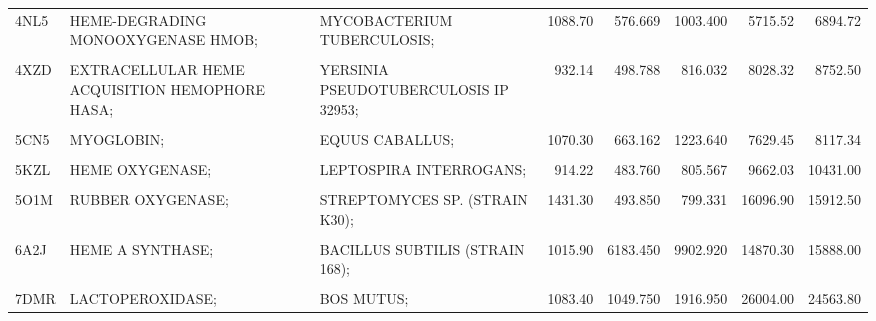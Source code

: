 \begin{table}
{\begin{tabular}{lllrrrrr}
				\addlinespace
				4NL5 & HEME-DEGRADING MONOOXYGENASE HMOB; & MYCOBACTERIUM TUBERCULOSIS; & 1088.70 & 576.669 & 1003.400 & 5715.52 & 6894.72\\
				\cellcolor{gray!6}{4UZV} & \cellcolor{gray!6}{HEMOGLOBIN;} & \cellcolor{gray!6}{THERMOBIFIDA FUSCA TM51;} & \cellcolor{gray!6}{1184.10} & \cellcolor{gray!6}{526.584} & \cellcolor{gray!6}{844.058} & \cellcolor{gray!6}{7378.28} & \cellcolor{gray!6}{8322.74}\\
				4XZD & EXTRACELLULAR HEME ACQUISITION HEMOPHORE HASA; & YERSINIA PSEUDOTUBERCULOSIS IP 32953; & 932.14 & 498.788 & 816.032 & 8028.32 & 8752.50\\
				\cellcolor{gray!6}{4Y1Q} & \cellcolor{gray!6}{EXTRACELLULAR HEME ACQUISITION HEMOPHORE HASA;} & \cellcolor{gray!6}{YERSINIA PSEUDOTUBERCULOSIS IP 32953;} & \cellcolor{gray!6}{952.23} & \cellcolor{gray!6}{494.939} & \cellcolor{gray!6}{806.960} & \cellcolor{gray!6}{7905.84} & \cellcolor{gray!6}{8785.04}\\
				5CN5 & MYOGLOBIN; & EQUUS CABALLUS; & 1070.30 & 663.162 & 1223.640 & 7629.45 & 8117.34\\
				\addlinespace
				\cellcolor{gray!6}{5GJ3} & \cellcolor{gray!6}{PERIPLASMIC BINDING PROTEIN;} & \cellcolor{gray!6}{ROSEIFLEXUS SP. RS-1;} & \cellcolor{gray!6}{1108.20} & \cellcolor{gray!6}{756.603} & \cellcolor{gray!6}{1131.670} & \cellcolor{gray!6}{11394.00} & \cellcolor{gray!6}{12591.80}\\
				5KZL & HEME OXYGENASE; & LEPTOSPIRA INTERROGANS; & 914.22 & 483.760 & 805.567 & 9662.03 & 10431.00\\
				\cellcolor{gray!6}{5O1L} & \cellcolor{gray!6}{RUBBER OXYGENASE;} & \cellcolor{gray!6}{STREPTOMYCES SP. (STRAIN K30);} & \cellcolor{gray!6}{1438.70} & \cellcolor{gray!6}{801.519} & \cellcolor{gray!6}{1447.270} & \cellcolor{gray!6}{15538.20} & \cellcolor{gray!6}{16876.00}\\
				5O1M & RUBBER OXYGENASE; & STREPTOMYCES SP. (STRAIN K30); & 1431.30 & 493.850 & 799.331 & 16096.90 & 15912.50\\
				\cellcolor{gray!6}{5VEU} & \cellcolor{gray!6}{CYTOCHROME P450 3A5;} & \cellcolor{gray!6}{HOMO SAPIENS;} & \cellcolor{gray!6}{964.76} & \cellcolor{gray!6}{993.578} & \cellcolor{gray!6}{1502.660} & \cellcolor{gray!6}{20900.80} & \cellcolor{gray!6}{20425.90}\\
				\addlinespace
				6A2J & HEME A SYNTHASE; & BACILLUS SUBTILIS (STRAIN 168); & 1015.90 & 6183.450 & 9902.920 & 14870.30 & 15888.00\\
				\cellcolor{gray!6}{7C74} & \cellcolor{gray!6}{LACTOPEROXIDASE;} & \cellcolor{gray!6}{BOS MUTUS;} & \cellcolor{gray!6}{1155.10} & \cellcolor{gray!6}{497.527} & \cellcolor{gray!6}{820.381} & \cellcolor{gray!6}{26111.40} & \cellcolor{gray!6}{25094.20}\\
				7DMR & LACTOPEROXIDASE; & BOS MUTUS; & 1083.40 & 1049.750 & 1916.950 & 26004.00 & 24563.80\\
				\bottomrule
		\end{tabular}}
	\end{table}



